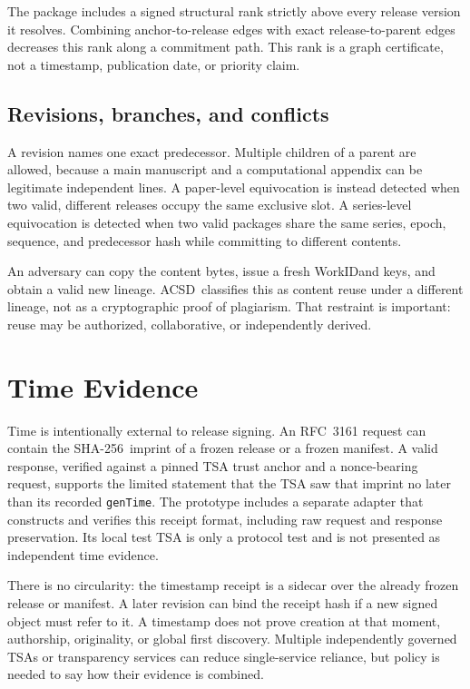 \documentclass[11pt]{article}
\newcommand{\workid}{\textsf{WorkID}}
\newcommand{\acsd}{\textsc{ACSD}}
\newcommand{\sha}{\textsf{SHA-256}}
\begin{document}
The package includes a signed structural rank strictly above every release version it resolves. Combining anchor-to-release edges with exact release-to-parent edges decreases this rank along a commitment path. This rank is a graph certificate, not a timestamp, publication date, or priority claim.

\subsection{Revisions, branches, and conflicts}

A revision names one exact predecessor. Multiple children of a parent are allowed, because a main manuscript and a computational appendix can be legitimate independent lines. A paper-level equivocation is instead detected when two valid, different releases occupy the same exclusive slot. A series-level equivocation is detected when two valid packages share the same series, epoch, sequence, and predecessor hash while committing to different contents.

An adversary can copy the content bytes, issue a fresh \workid and keys, and obtain a valid new lineage. \acsd\ classifies this as content reuse under a different lineage, not as a cryptographic proof of plagiarism. That restraint is important: reuse may be authorized, collaborative, or independently derived.

\section{Time Evidence}

Time is intentionally external to release signing. An RFC~3161 request can contain the \sha\ imprint of a frozen release or a frozen manifest. A valid response, verified against a pinned TSA trust anchor and a nonce-bearing request, supports the limited statement that the TSA saw that imprint no later than its recorded \texttt{genTime}. The prototype includes a separate adapter that constructs and verifies this receipt format, including raw request and response preservation. Its local test TSA is only a protocol test and is not presented as independent time evidence.

There is no circularity: the timestamp receipt is a sidecar over the already frozen release or manifest. A later revision can bind the receipt hash if a new signed object must refer to it. A timestamp does not prove creation at that moment, authorship, originality, or global first discovery. Multiple independently governed TSAs or transparency services can reduce single-service reliance, but policy is needed to say how their evidence is combined.
\end{document}
